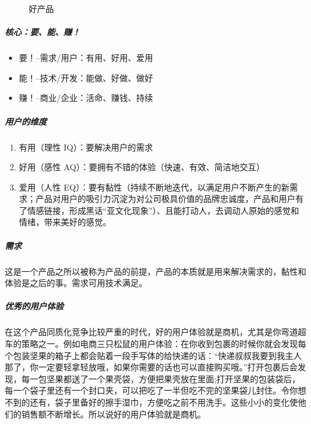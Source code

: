 \documentclass[letterpaper,11pt,english]{sphinxmanual}
\begin{document}
\begin{figure}[H]
\centering
\capstart

\noindent{}
\caption{好产品}\label{\detokenize{chapter_introduction/Product:id50}}\end{figure}


\subparagraph{核心：要、能、赚！}
\label{\detokenize{chapter_introduction/Product:id6}}\begin{itemize}
\item {} 
要！–需求/用户：有用、好用、爱用

\item {} 
能！–技术/开发：能做、好做、做好

\item {} 
赚！–商业/企业：活命、赚钱、持续

\end{itemize}


\subparagraph{用户的维度}
\label{\detokenize{chapter_introduction/Product:id7}}\begin{enumerate}
%
\item {} 
有用（理性 IQ）：要解决用户的需求

\item {} 
好用（感性 AQ）：要拥有不错的体验（快速、有效、简洁地交互）

\item {} 
爱用（人性
EQ）：要有黏性（持续不断地迭代，以满足用户不断产生的新需求；产品对用户的吸引力沉淀为对公司极具价值的品牌忠诚度，产品和用户有了情感链接，形成黑话“亚文化现象”）、且能打动人，去调动人原始的感觉和情绪，带来美好的感觉。%
\begin{footnote}[17]\sphinxAtStartFootnote
{}
%
\end{footnote}

\end{enumerate}


\subparagraph{需求}
\label{\detokenize{chapter_introduction/Product:id8}}
这是一个产品之所以被称为产品的前提，产品的本质就是用来解决需求的，黏性和体验是之后的事。需求可用技术满足。


\subparagraph{优秀的用户体验}
\label{\detokenize{chapter_introduction/Product:id9}}
在这个产品同质化竞争比较严重的时代，好的用户体验就是商机，尤其是你弯道超车的策略之一。例如电商三只松鼠的用户体验：在你收到包裹的时候你就会发现每个包装坚果的箱子上都会贴着一段手写体的给快递的话：“快递叔叔我要到我主人那了，你一定要轻拿轻放哦，如果你需要的话也可以直接购买哦。”打开包裹后会发现，每一包坚果都送了一个果壳袋，方便把果壳放在里面;打开坚果的包装袋后，每一个袋子里还有一个封口夹，可以把吃了一半但吃不完的坚果袋儿封住。令你想不到的还有，袋子里备好的擦手湿巾，方便吃之前不用洗手。这些小小的变化使他们的销售额不断增长。所以说好的用户体验就是商机。
\end{document}
